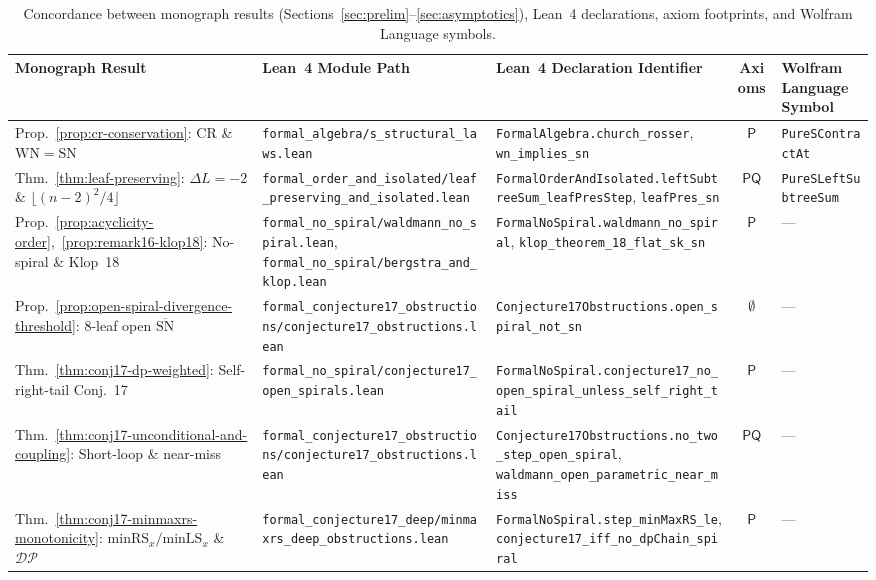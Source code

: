 \documentclass[11pt,reqno]{amsart}
\numberwithin{equation}{section}
\theoremstyle{plain}
\theoremstyle{definition}
\theoremstyle{remark}
\newcommand{\SN}{\mathrm{SN}}
\newcommand{\WN}{\mathrm{WN}}
\begin{document}
\begin{table}[htbp]
\centering
\caption{Concordance between monograph results (Sections~\ref{sec:prelim}--\ref{sec:asymptotics}), Lean~4 declarations, axiom footprints, and Wolfram Language symbols.}
\label{tab:concordance}
\scriptsize
\setlength{\tabcolsep}{3.0pt}
\renewcommand{\arraystretch}{1.12}
\begin{tabular}{@{}lllcl@{}}
\toprule
Monograph Result & Lean~4 Module Path & Lean~4 Declaration Identifier & Axioms & Wolfram Language Symbol \\
\midrule
Prop.~\ref{prop:cr-conservation}: CR \& $\WN = \SN$ & \texttt{formal\_algebra/s\_structural\_laws.lean} & \texttt{FormalAlgebra.church\_rosser}, \texttt{wn\_implies\_sn} & $\mathsf{P}$ & \texttt{PureSContractAt} \\
Thm.~\ref{thm:leaf-preserving}: $\Delta L = -2$ \& $\lfloor(n{-}2)^2/4\rfloor$ & \texttt{formal\_order\_and\_isolated/leaf\_preserving\_and\_isolated.lean} & \texttt{FormalOrderAndIsolated.leftSubtreeSum\_leafPresStep}, \texttt{leafPres\_sn} & $\mathsf{PQ}$ & \texttt{PureSLeftSubtreeSum} \\
Prop.~\ref{prop:acyclicity-order},~\ref{prop:remark16-klop18}: No-spiral \& Klop~18 & \texttt{formal\_no\_spiral/waldmann\_no\_spiral.lean}, \texttt{formal\_no\_spiral/bergstra\_and\_klop.lean} & \texttt{FormalNoSpiral.waldmann\_no\_spiral}, \texttt{klop\_theorem\_18\_flat\_sk\_sn} & $\mathsf{P}$ & --- \\
Prop.~\ref{prop:open-spiral-divergence-threshold}: $8$-leaf open $\overline{\SN}$ & \texttt{formal\_conjecture17\_obstructions/conjecture17\_obstructions.lean} & \texttt{Conjecture17Obstructions.open\_spiral\_not\_sn} & $\emptyset$ & --- \\
Thm.~\ref{thm:conj17-dp-weighted}: Self-right-tail Conj.~17 & \texttt{formal\_no\_spiral/conjecture17\_open\_spirals.lean} & \texttt{FormalNoSpiral.conjecture17\_no\_open\_spiral\_unless\_self\_right\_tail} & $\mathsf{P}$ & --- \\
Thm.~\ref{thm:conj17-unconditional-and-coupling}: Short-loop \& near-miss & \texttt{formal\_conjecture17\_obstructions/conjecture17\_obstructions.lean} & \texttt{Conjecture17Obstructions.no\_two\_step\_open\_spiral}, \texttt{waldmann\_open\_parametric\_near\_miss} & $\mathsf{PQ}$ & --- \\
Thm.~\ref{thm:conj17-minmaxrs-monotonicity}: $\mathrm{minRS}_x/\mathrm{minLS}_x$ \& $\mathcal{DP}$ & \texttt{formal\_conjecture17\_deep/minmaxrs\_deep\_obstructions.lean} & \texttt{FormalNoSpiral.step\_minMaxRS\_le}, \texttt{conjecture17\_iff\_no\_dpChain\_spiral} & $\mathsf{P}$ & --- \\

\end{tabular}
\end{table}
\end{document}
